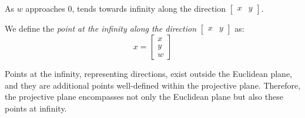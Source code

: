 As $w$ approaches $0$, tends towards infinity along the direction $\begin{bmatrix} x & y \end{bmatrix}$. 
\begin{definition}
    We define the \emph{point at the infinity along the direction} $\begin{bmatrix} x & y \end{bmatrix}$ as: 
    \[x=\begin{bmatrix} x \\ y \\ w \end{bmatrix}\]
\end{definition}
Points at the infinity, representing directions, exist outside the Euclidean plane, and they are additional points well-defined within the projective plane. 
Therefore, the projective plane encompasses not only the Euclidean plane but also these points at infinity.